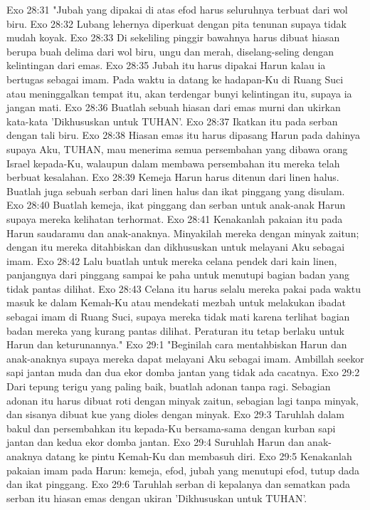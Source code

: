 Exo 28:31  "Jubah yang dipakai di atas efod harus seluruhnya terbuat dari wol biru.
Exo 28:32  Lubang lehernya diperkuat dengan pita tenunan supaya tidak mudah koyak.
Exo 28:33  Di sekeliling pinggir bawahnya harus dibuat hiasan berupa buah delima dari wol biru, ungu dan merah, diselang-seling dengan kelintingan dari emas.
Exo 28:35  Jubah itu harus dipakai Harun kalau ia bertugas sebagai imam. Pada waktu ia datang ke hadapan-Ku di Ruang Suci atau meninggalkan tempat itu, akan terdengar bunyi kelintingan itu, supaya ia jangan mati.
Exo 28:36  Buatlah sebuah hiasan dari emas murni dan ukirkan kata-kata 'Dikhususkan untuk TUHAN'.
Exo 28:37  Ikatkan itu pada serban dengan tali biru.
Exo 28:38  Hiasan emas itu harus dipasang Harun pada dahinya supaya Aku, TUHAN, mau menerima semua persembahan yang dibawa orang Israel kepada-Ku, walaupun dalam membawa persembahan itu mereka telah berbuat kesalahan.
Exo 28:39  Kemeja Harun harus ditenun dari linen halus. Buatlah juga sebuah serban dari linen halus dan ikat pinggang yang disulam.
Exo 28:40  Buatlah kemeja, ikat pinggang dan serban untuk anak-anak Harun supaya mereka kelihatan terhormat.
Exo 28:41  Kenakanlah pakaian itu pada Harun saudaramu dan anak-anaknya. Minyakilah mereka dengan minyak zaitun; dengan itu mereka ditahbiskan dan dikhususkan untuk melayani Aku sebagai imam.
Exo 28:42  Lalu buatlah untuk mereka celana pendek dari kain linen, panjangnya dari pinggang sampai ke paha untuk menutupi bagian badan yang tidak pantas dilihat.
Exo 28:43  Celana itu harus selalu mereka pakai pada waktu masuk ke dalam Kemah-Ku atau mendekati mezbah untuk melakukan ibadat sebagai imam di Ruang Suci, supaya mereka tidak mati karena terlihat bagian badan mereka yang kurang pantas dilihat. Peraturan itu tetap berlaku untuk Harun dan keturunannya."
Exo 29:1  "Beginilah cara mentahbiskan Harun dan anak-anaknya supaya mereka dapat melayani Aku sebagai imam. Ambillah seekor sapi jantan muda dan dua ekor domba jantan yang tidak ada cacatnya.
Exo 29:2  Dari tepung terigu yang paling baik, buatlah adonan tanpa ragi. Sebagian adonan itu harus dibuat roti dengan minyak zaitun, sebagian lagi tanpa minyak, dan sisanya dibuat kue yang dioles dengan minyak.
Exo 29:3  Taruhlah dalam bakul dan persembahkan itu kepada-Ku bersama-sama dengan kurban sapi jantan dan kedua ekor domba jantan.
Exo 29:4  Suruhlah Harun dan anak-anaknya datang ke pintu Kemah-Ku dan membasuh diri.
Exo 29:5  Kenakanlah pakaian imam pada Harun: kemeja, efod, jubah yang menutupi efod, tutup dada dan ikat pinggang.
Exo 29:6  Taruhlah serban di kepalanya dan sematkan pada serban itu hiasan emas dengan ukiran 'Dikhususkan untuk TUHAN'.

